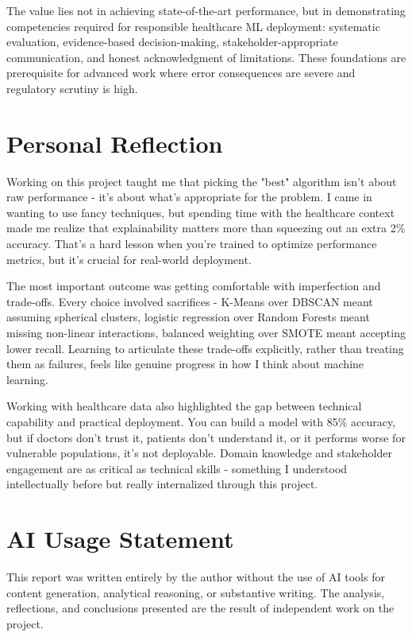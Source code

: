 \documentclass[12pt,a4paper]{article}
\begin{document}
The value lies not in achieving state-of-the-art performance, but in demonstrating competencies required for responsible healthcare ML deployment: systematic evaluation, evidence-based decision-making, stakeholder-appropriate communication, and honest acknowledgment of limitations. These foundations are prerequisite for advanced work where error consequences are severe and regulatory scrutiny is high.

\section{Personal Reflection}

Working on this project taught me that picking the "best" algorithm isn't about raw performance - it's about what's appropriate for the problem. I came in wanting to use fancy techniques, but spending time with the healthcare context made me realize that explainability matters more than squeezing out an extra 2\% accuracy. That's a hard lesson when you're trained to optimize performance metrics, but it's crucial for real-world deployment.

The most important outcome was getting comfortable with imperfection and trade-offs. Every choice involved sacrifices - K-Means over DBSCAN meant assuming spherical clusters, logistic regression over Random Forests meant missing non-linear interactions, balanced weighting over SMOTE meant accepting lower recall. Learning to articulate these trade-offs explicitly, rather than treating them as failures, feels like genuine progress in how I think about machine learning.

Working with healthcare data also highlighted the gap between technical capability and practical deployment. You can build a model with 85\% accuracy, but if doctors don't trust it, patients don't understand it, or it performs worse for vulnerable populations, it's not deployable. Domain knowledge and stakeholder engagement are as critical as technical skills - something I understood intellectually before but really internalized through this project.

\section{AI Usage Statement}

This report was written entirely by the author without the use of AI tools for content generation, analytical reasoning, or substantive writing. The analysis, reflections, and conclusions presented are the result of independent work on the project.
\end{document}
